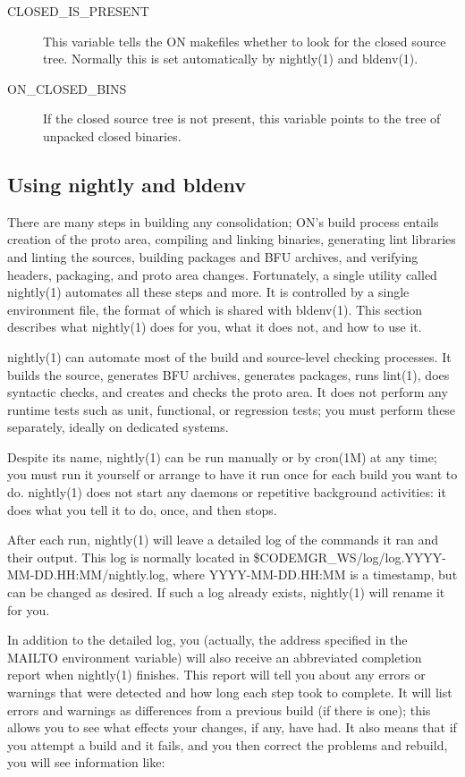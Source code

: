 \documentclass{article}
\begin{document}
\begin{description}
\item[CLOSED\_IS\_PRESENT]

  This variable tells the ON makefiles whether to look for the closed source
  tree. Normally this is set automatically by nightly(1) and bldenv(1).

\item[ON\_CLOSED\_BINS]

  If the closed source tree is not present, this variable points to the tree of
  unpacked closed binaries.
\end{description}


\subsection*{Using nightly and bldenv}

There are many steps in building any consolidation; ON's build process entails
creation of the proto area, compiling and linking binaries, generating lint
libraries and linting the sources, building packages and BFU archives, and
verifying headers, packaging, and proto area changes. Fortunately, a single
utility called nightly(1) automates all these steps and more. It is controlled
by a single environment file, the format of which is shared with bldenv(1). This
section describes what nightly(1) does for you, what it does not, and how to use
it.

nightly(1) can automate most of the build and source-level checking
processes. It builds the source, generates BFU archives, generates packages,
runs lint(1), does syntactic checks, and creates and checks the proto area. It
does not perform any runtime tests such as unit, functional, or regression
tests; you must perform these separately, ideally on dedicated systems. 

Despite its name, nightly(1) can be run manually or by cron(1M) at any time; you
must run it yourself or arrange to have it run once for each build you want to
do. nightly(1) does not start any daemons or repetitive background activities:
it does what you tell it to do, once, and then stops.

After each run, nightly(1) will leave a detailed log of the commands it ran and
their output.  This log is normally located in
\$CODEMGR\_WS/log/log.YYYY-MM-DD.HH:MM/nightly.log, where YYYY-MM-DD.HH:MM is a
timestamp, but can be changed as desired. If such a log already exists,
nightly(1) will rename it for you.

In addition to the detailed log, you (actually, the address specified in the
MAILTO environment variable) will also receive an abbreviated completion report
when nightly(1) finishes. This report will tell you about any errors or warnings
that were detected and how long each step took to complete. It will list errors
and warnings as differences from a previous build (if there is one); this allows
you to see what effects your changes, if any, have had. It also means that if
you attempt a build and it fails, and you then correct the problems and rebuild,
you will see information like:
\end{document}
